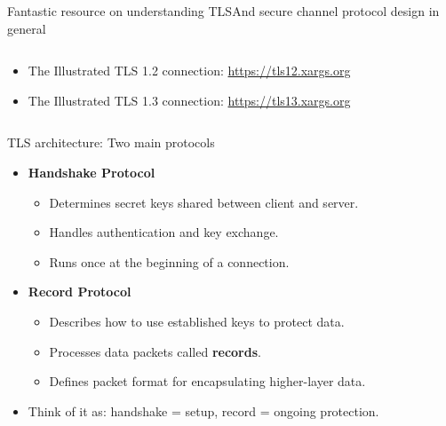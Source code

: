 \documentclass[aspectratio=169, lualatex, handout]{beamer}
\begin{document}
\begin{frame}{Fantastic resource on understanding TLS}{And secure channel protocol design in general}
	\begin{columns}[c]
		\begin{column}{0.5\textwidth}
			\begin{itemize}
				\item The Illustrated TLS 1.2 connection: \url{https://tls12.xargs.org}
				\item The Illustrated TLS 1.3 connection: \url{https://tls13.xargs.org}
			\end{itemize}
		\end{column}
		\begin{column}{0.5\textwidth}
		\end{column}
	\end{columns}
\end{frame}

\begin{frame}{TLS architecture: Two main protocols}
	\begin{itemize}[<+->]
		\item \textbf{Handshake Protocol}
		      \begin{itemize}
			      \item Determines secret keys shared between client and server.
			      \item Handles authentication and key exchange.
			      \item Runs once at the beginning of a connection.
		      \end{itemize}
		\item \textbf{Record Protocol}
		      \begin{itemize}
			      \item Describes how to use established keys to protect data.
			      \item Processes data packets called \textbf{records}.
			      \item Defines packet format for encapsulating higher-layer data.
		      \end{itemize}
		\item Think of it as: handshake = setup, record = ongoing protection.
	\end{itemize}
\end{frame}
\end{document}
